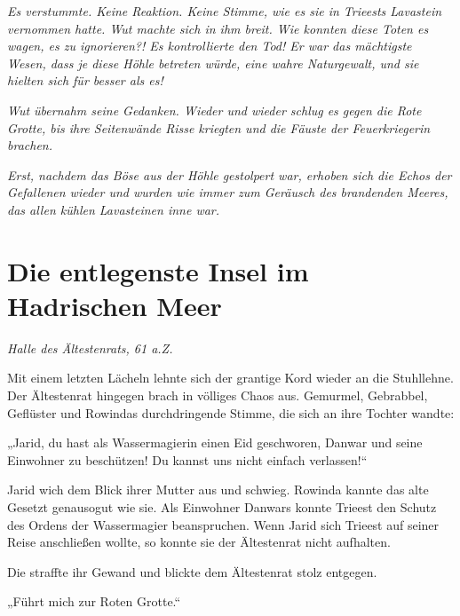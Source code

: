 \textit{Es verstummte. Keine Reaktion. Keine Stimme, wie es sie in Trieests Lavastein vernommen hatte. Wut machte sich in ihm breit. Wie konnten diese Toten es wagen, es zu ignorieren?! Es kontrollierte den Tod! Er war das mächtigste Wesen, dass je diese Höhle betreten würde, eine wahre Naturgewalt, und sie hielten sich für besser als es!}

\textit{Wut übernahm seine Gedanken. Wieder und wieder schlug es gegen die Rote Grotte, bis ihre Seitenwände Risse kriegten und die Fäuste der Feuerkriegerin brachen.}

\textit{Erst, nachdem das Böse aus der Höhle gestolpert war, erhoben sich die Echos der Gefallenen wieder und wurden wie immer zum Geräusch des brandenden Meeres, das allen kühlen Lavasteinen inne war.}
















\newpage
\section{Die entlegenste Insel im Hadrischen Meer}






\textit{Halle des Ältestenrats, 61 a.Z.}\bigskip



Mit einem letzten Lächeln lehnte sich der grantige Kord wieder an die Stuhllehne. Der Ältestenrat hingegen brach in völliges Chaos aus. Gemurmel, Gebrabbel, Geflüster und Rowindas durchdringende Stimme, die sich an ihre Tochter wandte:

„Jarid, du hast als Wassermagierin einen Eid geschworen, Danwar und seine Einwohner zu beschützen! Du kannst uns nicht einfach verlassen!“

Jarid wich dem Blick ihrer Mutter aus und schwieg. Rowinda kannte das alte Gesetzt genausogut wie sie. Als Einwohner Danwars konnte Trieest den Schutz des Ordens der Wassermagier beanspruchen. Wenn Jarid sich Trieest auf seiner Reise anschließen wollte, so konnte sie der Ältestenrat nicht aufhalten.

Die straffte ihr Gewand und blickte dem Ältestenrat stolz entgegen.

„Führt mich zur Roten Grotte.“









